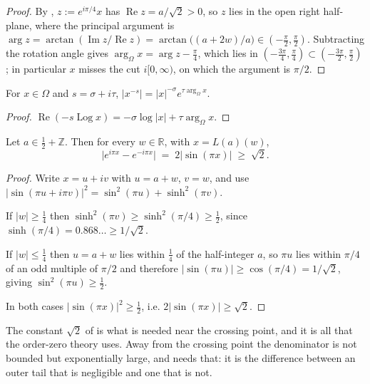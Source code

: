 \begin{proof}
\leanok
By , $z:=e^{i\pi/4}x$ has $\operatorname{Re}z=a/\sqrt2>0$, so
$z$ lies in the open right half-plane, where the principal argument is
$\arg z=\arctan(\operatorname{Im}z/\operatorname{Re}z)=\arctan\bigl((a+2w)/a\bigr)\in(-\tfrac\pi2,\tfrac\pi2)$.
Subtracting the rotation angle gives $\arg_{\Omega}x=\arg z-\tfrac\pi4$, which lies in
$(-\tfrac{3\pi}4,\tfrac\pi4)\subset(-\tfrac{3\pi}2,\tfrac\pi2)$; in particular $x$ misses
the cut $i[0,\infty)$, on which the argument is $\pi/2$.
\end{proof}

\begin{lemma}
\label{lem:rs_power_modulus}
\leanok
{}
For $x\in\Omega$ and $s=\sigma+i\tau$,
$\bigl|x^{-s}\bigr|=\lvert x\rvert^{-\sigma}e^{\tau\arg_{\Omega}x}$.
\end{lemma}

\begin{proof}
\leanok
$\operatorname{Re}(-s\operatorname{Log}x)=-\sigma\log|x|+\tau\arg_{\Omega}x$.
\end{proof}

\begin{lemma}
\label{lem:rs_sin_lower}
\leanok
{}
Let $a\in\tfrac12+\mathbb{Z}$.  Then for every $w\in\mathbb{R}$, with $x=L(a)(w)$,
\[
  \bigl|e^{i\pi x}-e^{-i\pi x}\bigr|\;=\;2\lvert\sin(\pi x)\rvert\;\ge\;\sqrt2 .
\]
\end{lemma}

\begin{proof}
\leanok
Write $x=u+iv$ with $u=a+w$, $v=w$, and use
$\lvert\sin(\pi u+i\pi v)\rvert^{2}=\sin^{2}(\pi u)+\sinh^{2}(\pi v)$.

If $\lvert w\rvert\ge\tfrac14$ then
$\sinh^{2}(\pi v)\ge\sinh^{2}(\pi/4)\ge\tfrac12$, since
$\sinh(\pi/4)=0.868\ldots\ge 1/\sqrt2$.

If $\lvert w\rvert\le\tfrac14$ then $u=a+w$ lies within $\tfrac14$ of the half-integer
$a$, so $\pi u$ lies within $\pi/4$ of an odd multiple of $\pi/2$ and therefore
$\lvert\sin(\pi u)\rvert\ge\cos(\pi/4)=1/\sqrt2$, giving $\sin^{2}(\pi u)\ge\tfrac12$.

In both cases $\lvert\sin(\pi x)\rvert^{2}\ge\tfrac12$, i.e. $2|\sin(\pi x)|\ge\sqrt2$.
\end{proof}

The constant $\sqrt2$ of  is what is needed near the crossing point, and
it is all that the order-zero theory uses.  Away from the crossing point the denominator is not
bounded but exponentially large, and  needs that: it is the difference
between an outer tail that is negligible and one that is not.

